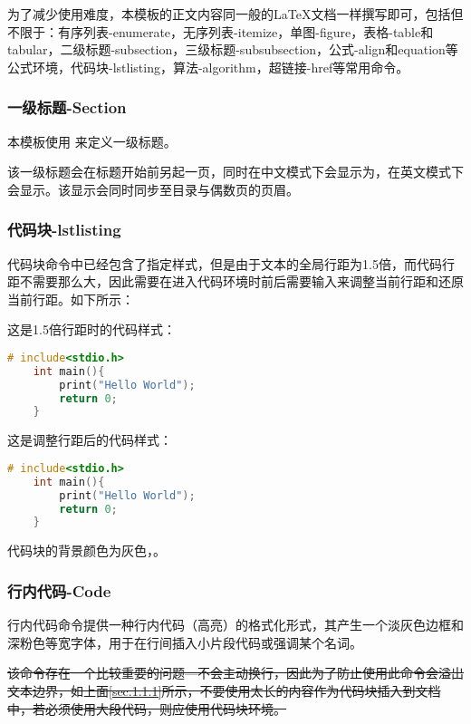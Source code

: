 \documentclass{nitthesis}
\begin{document}
为了减少使用难度，本模板的正文内容同一般的\LaTeX 文档一样撰写即可，包括但不限于：有序列表-enumerate，无序列表-itemize，单图-figure，表格-table和tabular，二级标题-subsection，三级标题-subsubsection，公式-align和equation等公式环境，代码块-lstlisting，算法-algorithm，超链接-href等常用命令。

\subsubsection{一级标题-Section}

本模板使用  来定义一级标题。

该一级标题会在标题开始前另起一页，同时在中文模式下会显示为，在英文模式下会显示。该显示会同时同步至目录与偶数页的页眉。

\subsubsection{代码块-lstlisting}

代码块命令中已经包含了指定样式，但是由于文本的全局行距为1.5倍，而代码行距不需要那么大，因此需要在进入代码环境时前后需要输入来调整当前行距和还原当前行距。如下所示：

这是1.5倍行距时的代码样式：

\begin{lstlisting}[language=C]
    # include<stdio.h>
    int main(){
        print("Hello World");
        return 0;
    }
\end{lstlisting}

这是调整行距后的代码样式：

\linespread{1}
\begin{lstlisting}[language=C]
    # include<stdio.h>
    int main(){
        print("Hello World");
        return 0;
    }
\end{lstlisting}
\linespread{1.5}

代码块的背景颜色为灰色，。

\subsubsection{行内代码-Code}

行内代码命令提供一种行内代码（高亮）的格式化形式，其产生一个淡灰色边框和深粉色等宽字体，用于在行间插入小片段代码或强调某个名词。

\sout{该命令存在一个比较重要的问题---不会主动换行，因此为了防止使用此命令会溢出文本边界，如上面\ref{sec.1.1.1}所示，不要使用太长的内容作为代码块插入到文档中，若必须使用大段代码，则应使用代码块环境。}
\end{document}
